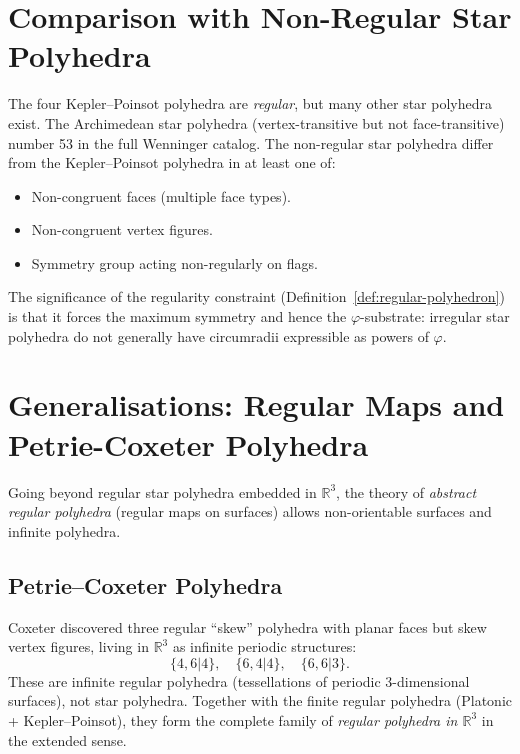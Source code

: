 \section{Comparison with Non-Regular Star Polyhedra}
\label{sec:non-regular-star}

The four Kepler–Poinsot polyhedra are \emph{regular}, but
many other star polyhedra exist.  The Archimedean star polyhedra
(vertex-transitive but not face-transitive) number 53 in the
full Wenninger catalog.  The non-regular star polyhedra
differ from the Kepler–Poinsot polyhedra in at least one of:
\begin{itemize}
  \item Non-congruent faces (multiple face types).
  \item Non-congruent vertex figures.
  \item Symmetry group acting non-regularly on flags.
\end{itemize}

The significance of the regularity constraint
(Definition~\ref{def:regular-polyhedron}) is that it forces the
maximum symmetry and hence the $\varphi$-substrate: irregular
star polyhedra do not generally have circumradii expressible as
powers of $\varphi$.

\section{Generalisations: Regular Maps and Petrie-Coxeter Polyhedra}
\label{sec:generalisations}

Going beyond regular star polyhedra embedded in $\mathbb{R}^3$,
the theory of \emph{abstract regular polyhedra} (regular maps
on surfaces) allows non-orientable surfaces and infinite
polyhedra.

\subsection{Petrie–Coxeter Polyhedra}
\label{ssec:petrie-coxeter}

Coxeter discovered three regular ``skew'' polyhedra with planar
faces but skew vertex figures, living in $\mathbb{R}^3$ as
infinite periodic structures:
\[
  \{4,6|4\},\quad \{6,4|4\},\quad \{6,6|3\}.
\]
These are infinite regular polyhedra (tessellations of periodic
3-dimensional surfaces), not star polyhedra.  Together with
the finite regular polyhedra (Platonic + Kepler–Poinsot), they
form the complete family of \emph{regular polyhedra in
$\mathbb{R}^3$} in the extended sense.

